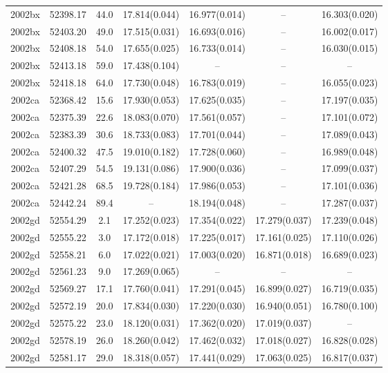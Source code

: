 \begin{table*}
\begin{tabular}{ccccccc}
2002bx	  & 52398.17	 & 44.0	& 17.814(0.044)	 & 16.977(0.014)	 & --	 & 16.303(0.020) \\ 
2002bx	  & 52403.20	 & 49.0	& 17.515(0.031)	 & 16.693(0.016)	 & --	 & 16.002(0.017) \\ 
2002bx	  & 52408.18	 & 54.0	& 17.655(0.025)	 & 16.733(0.014)	 & --	 & 16.030(0.015) \\ 
2002bx	  & 52413.18	 & 59.0	& 17.438(0.104)	 & --	 & --	 & -- \\ 
2002bx	  & 52418.18	 & 64.0	& 17.730(0.048)	 & 16.783(0.019)	 & --	 & 16.055(0.023) \\ 
2002ca	  & 52368.42	 & 15.6	& 17.930(0.053)	 & 17.625(0.035)	 & --	 & 17.197(0.035) \\ 
2002ca	  & 52375.39	 & 22.6	& 18.083(0.070)	 & 17.561(0.057)	 & --	 & 17.101(0.072) \\ 
2002ca	  & 52383.39	 & 30.6	& 18.733(0.083)	 & 17.701(0.044)	 & --	 & 17.089(0.043) \\ 
2002ca	  & 52400.32	 & 47.5	& 19.010(0.182)	 & 17.728(0.060)	 & --	 & 16.989(0.048) \\ 
2002ca	  & 52407.29	 & 54.5	& 19.131(0.086)	 & 17.900(0.036)	 & --	 & 17.099(0.037) \\ 
2002ca	  & 52421.28	 & 68.5	& 19.728(0.184)	 & 17.986(0.053)	 & --	 & 17.101(0.036) \\ 
2002ca	  & 52442.24	 & 89.4	& --	 & 18.194(0.048)	 & --	 & 17.287(0.037) \\ 
2002gd	  & 52554.29	 & 2.1	& 17.252(0.023)	 & 17.354(0.022)	 & 17.279(0.037)	 & 17.239(0.048) \\ 
2002gd	  & 52555.22	 & 3.0	& 17.172(0.018)	 & 17.225(0.017)	 & 17.161(0.025)	 & 17.110(0.026) \\ 
2002gd	  & 52558.21	 & 6.0	& 17.022(0.021)	 & 17.003(0.020)	 & 16.871(0.018)	 & 16.689(0.023) \\ 
2002gd	  & 52561.23	 & 9.0	& 17.269(0.065)	 & --	 & --	 & -- \\ 
2002gd	  & 52569.27	 & 17.1	& 17.760(0.041)	 & 17.291(0.045)	 & 16.899(0.027)	 & 16.719(0.035) \\ 
2002gd	  & 52572.19	 & 20.0	& 17.834(0.030)	 & 17.220(0.030)	 & 16.940(0.051)	 & 16.780(0.100) \\ 
2002gd	  & 52575.22	 & 23.0	& 18.120(0.031)	 & 17.362(0.020)	 & 17.019(0.037)	 & -- \\ 
2002gd	  & 52578.19	 & 26.0	& 18.260(0.042)	 & 17.462(0.032)	 & 17.018(0.027)	 & 16.828(0.028) \\ 
2002gd	  & 52581.17	 & 29.0	& 18.318(0.057)	 & 17.441(0.029)	 & 17.063(0.025)	 & 16.817(0.037) \\ 

\end{tabular}
\end{table*}
